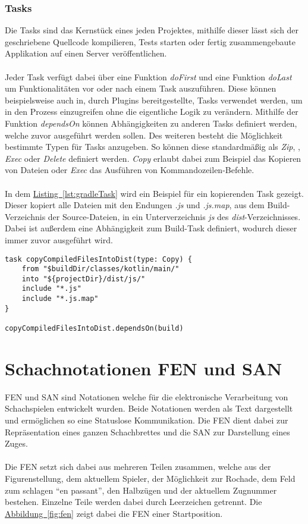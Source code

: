\subsubsection{Tasks}
Die Tasks sind das Kernstück eines jeden Projektes, mithilfe dieser lässt sich der geschriebene Quellcode kompilieren, Tests starten oder fertig zusammengebaute Applikation auf einen Server veröffentlichen.\\
\\
Jeder Task verfügt dabei über eine Funktion \textit{doFirst} und eine Funktion \textit{doLast} um Funktionalitäten vor oder nach einem Task auszuführen. Diese können beispielsweise auch in, durch Plugins bereitgestellte, Tasks verwendet werden, um in den Prozess einzugreifen ohne die eigentliche Logik zu verändern. Mithilfe der Funktion \textit{dependsOn} können Abhängigkeiten zu anderen Tasks definiert werden, welche zuvor ausgeführt werden sollen. Des weiteren besteht die Möglichkeit bestimmte Typen für Tasks anzugeben. So können diese standardmäßig als \textit{Zip}, , \textit{Exec} oder \textit{Delete} definiert werden. \textit{Copy} erlaubt dabei zum Beispiel das Kopieren von Dateien oder \textit{Exec} das Ausführen von Kommandozeilen-Befehle.\\
\\
In dem \hyperref[lst:gradleTask]{Listing~\ref{lst:gradleTask}} wird ein Beispiel für ein kopierenden Task gezeigt. Dieser kopiert alle Dateien mit den Endungen \textit{.js} und \textit{.js.map}, aus dem Build-Verzeichnis der Source-Dateien, in ein Unterverzeichnis \textit{js} des \textit{dist}-Verzeichnisses. Dabei ist außerdem eine Abhängigkeit zum Build-Task definiert, wodurch dieser immer zuvor ausgeführt wird.
\begin{lstlisting}[style=lstStyleFramed, language=Gradle, caption={Beispiel: Gradle-Task}, label=lst:gradleTask, float, floatplacement=T]
task copyCompiledFilesIntoDist(type: Copy) {
	from "$buildDir/classes/kotlin/main/"
	into "${projectDir}/dist/js/"
	include "*.js"
	include "*.js.map"
}

copyCompiledFilesIntoDist.dependsOn(build)
\end{lstlisting}

\section{Schachnotationen FEN und SAN}
\gls{FEN} und \gls{SAN} sind Notationen welche für die elektronische Verarbeitung von Schachspielen entwickelt wurden. Beide Notationen werden als Text dargestellt und ermöglichen so eine Statuslose Kommunikation. Die \gls{FEN} dient dabei zur Repräsentation eines ganzen Schachbrettes und die \gls{SAN} zur Darstellung eines Zuges.\\
\\
Die \gls{FEN} setzt sich dabei aus mehreren Teilen zusammen, welche aus der Figurenstellung, dem aktuellem Spieler, der Möglichkeit zur Rochade, dem Feld zum schlagen \enquote{en passant}, den Halbzügen und der aktuellem Zugnummer bestehen. Einzelne Teile werden dabei durch Leerzeichen getrennt. Die \hyperref[fig:fen]{Abbildung~\ref{fig:fen}} zeigt dabei die \gls{FEN} einer Startposition.\\

